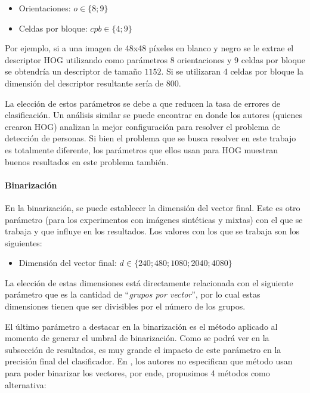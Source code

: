 	\begin{itemize}
		\item Orientaciones: $ o \in \{8; 9\}$
		\item Celdas por bloque: $ cpb \in \{4; 9\}$
	\end{itemize}
	
	Por ejemplo, si a una imagen de 48x48 píxeles en blanco y negro se le extrae el descriptor HOG utilizando como parámetros 8 orientaciones y 9 celdas por bloque se obtendría un descriptor de tamaño $1152$. Si se utilizaran 4 celdas por bloque la dimensión del descriptor resultante sería de $800$.
	
	 La elección de estos parámetros se debe a que reducen la tasa de errores de clasificación. Un análisis similar se puede encontrar en \cite{DT05} donde los autores (quienes crearon HOG) analizan la mejor configuración para resolver el problema de detección de personas. Si bien el problema que se busca resolver en este trabajo es totalmente diferente, los parámetros que ellos usan para HOG muestran buenos resultados en este problema también.

	\paragraph{Binarización}
	
	En la binarización, se puede establecer la dimensión del vector final. Este es otro parámetro (para los experimentos con imágenes sintéticas y mixtas) con el que se trabaja y que influye en los resultados. Los valores con los que se trabaja son los siguientes:

	\begin{itemize}
		\item Dimensión del vector final: $ d \in \{ 240; 480; 1080; 2040;  4080 \}$
	\end{itemize}
	
	La elección de estas dimensiones está directamente relacionada con el siguiente parámetro que es la cantidad de ``\textit{grupos por vector}'', por lo cual estas dimensiones tienen que ser divisibles por el número de los grupos.
	
	El último parámetro a destacar en la binarización es el método aplicado al momento de generar el umbral de binarización. Como se podrá ver en la subsección de resultados, es muy grande el impacto de este parámetro en la precisión final del clasificador. En \cite{wang}, los autores no especifican que método usan para poder binarizar los vectores, por ende, propusimos 4 métodos como alternativa:

